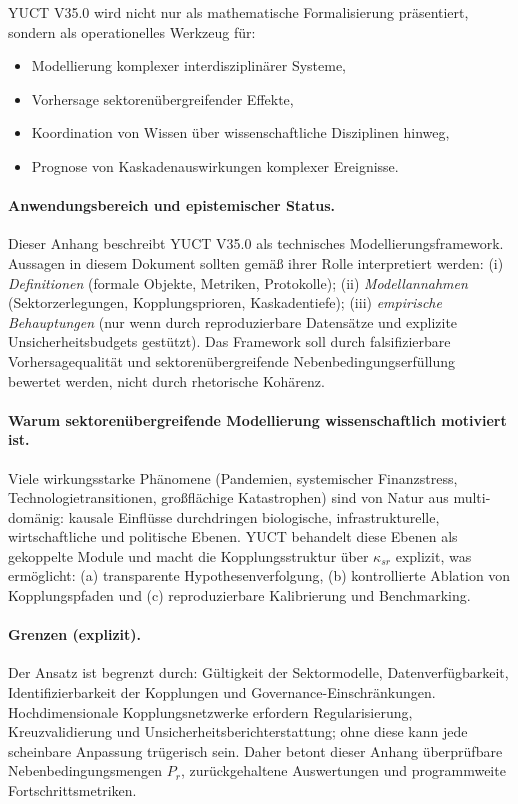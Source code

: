 \documentclass[13pt,a4paper]{article}
\begin{document}
	YUCT V35.0 wird nicht nur als mathematische Formalisierung präsentiert, sondern als operationelles Werkzeug für:
	\begin{itemize}[leftmargin=*]
		\item Modellierung komplexer interdisziplinärer Systeme,
		\item Vorhersage sektorenübergreifender Effekte,
		\item Koordination von Wissen über wissenschaftliche Disziplinen hinweg,
		\item Prognose von Kaskadenauswirkungen komplexer Ereignisse.
	\end{itemize}
	\paragraph{Anwendungsbereich und epistemischer Status.}
	Dieser Anhang beschreibt YUCT V35.0 als technisches Modellierungsframework. Aussagen in diesem Dokument sollten gemäß ihrer Rolle interpretiert werden: (i) \emph{Definitionen} (formale Objekte, Metriken, Protokolle); (ii) \emph{Modellannahmen} (Sektorzerlegungen, Kopplungsprioren, Kaskadentiefe); (iii) \emph{empirische Behauptungen} (nur wenn durch reproduzierbare Datensätze und explizite Unsicherheitsbudgets gestützt). Das Framework soll durch falsifizierbare Vorhersagequalität und sektorenübergreifende Nebenbedingungserfüllung bewertet werden, nicht durch rhetorische Kohärenz.
	
	\paragraph{Warum sektorenübergreifende Modellierung wissenschaftlich motiviert ist.}
	Viele wirkungsstarke Phänomene (Pandemien, systemischer Finanzstress, Technologietransitionen, großflächige Katastrophen) sind von Natur aus multi-domänig: kausale Einflüsse durchdringen biologische, infrastrukturelle, wirtschaftliche und politische Ebenen. YUCT behandelt diese Ebenen als gekoppelte Module und macht die Kopplungsstruktur über $\kappa_{sr}$ explizit, was ermöglicht: (a) transparente Hypothesenverfolgung, (b) kontrollierte Ablation von Kopplungspfaden und (c) reproduzierbare Kalibrierung und Benchmarking.
	
	\paragraph{Grenzen (explizit).}
	Der Ansatz ist begrenzt durch: Gültigkeit der Sektormodelle, Datenverfügbarkeit, Identifizierbarkeit der Kopplungen und Governance-Einschränkungen. Hochdimensionale Kopplungsnetzwerke erfordern Regularisierung, Kreuzvalidierung und Unsicherheitsberichterstattung; ohne diese kann jede scheinbare Anpassung trügerisch sein. Daher betont dieser Anhang überprüfbare Nebenbedingungsmengen $P_r$, zurückgehaltene Auswertungen und programmweite Fortschrittsmetriken.
	
\end{document}
